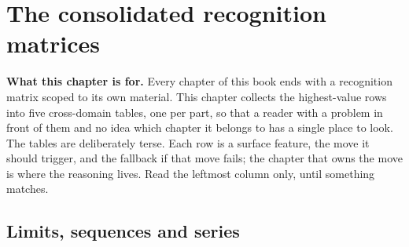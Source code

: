 \chapter{The consolidated recognition matrices}

\begin{orient}
\textbf{What this chapter is for.} Every chapter of this book ends with a recognition matrix scoped to its own material. This chapter collects the highest-value rows into five cross-domain tables, one per part, so that a reader with a problem in front of them and no idea which chapter it belongs to has a single place to look. The tables are deliberately terse. Each row is a surface feature, the move it should trigger, and the fallback if that move fails; the chapter that owns the move is where the reasoning lives. Read the leftmost column only, until something matches.
\end{orient}

\section{Limits, sequences and series}

